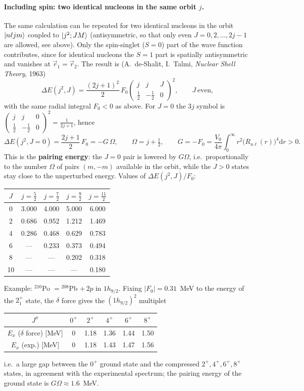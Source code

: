 \documentclass[11pt,a4paper]{article}
\newcommand{\ud}{\mathrm{d}}
\begin{document}
\paragraph{Including spin: two identical nucleons in the same orbit $j$.}
The same calculation can be repeated for two identical nucleons in the orbit $\ket{n\ell jm}$ coupled to $\ket{j^2;JM}$ (antisymmetric, so that only even $J=0,2,\dots,2j-1$ are allowed, see above). Only the spin-singlet ($S=0$) part of the wave function contributes, since for identical nucleons the $S=1$ part is spatially antisymmetric and vanishes at $\vec r_1=\vec r_2$. The result is (A.~de-Shalit, I.~Talmi, \emph{Nuclear Shell Theory}, 1963)
\[
\boxed{\Delta E(j^2,J)=\frac{(2j+1)^2}{2}\,F_0\begin{pmatrix}j&j&J\\\frac12&-\frac12&0\end{pmatrix}^2},\qquad J\ \text{even},
\]
with the same radial integral $F_0<0$ as above. For $J=0$ the 3$j$ symbol is $\begin{pmatrix}j&j&0\\\frac12&-\frac12&0\end{pmatrix}^2=\frac{1}{2j+1}$, hence
\[
\Delta E(j^2,J{=}0)=\frac{2j+1}{2}\,F_0=-G\,\Omega,\qquad \Omega=j+\tfrac12,\qquad G=-F_0=\frac{V_0}{4\pi}\int_0^\infty r^2\big(R_{n\ell}(r)\big)^4\ud r>0 .
\]
This is the \textbf{pairing energy}: the $J=0$ pair is lowered by $G\Omega$, i.e.\ proportionally to the number $\Omega$ of pairs $(m,-m)$ available in the orbit, while the $J>0$ states stay close to the unperturbed energy. Values of $\Delta E(j^2,J)/F_0$:
\begin{center}
\begin{tabular}{c c c c c}
$J$ & $j=\frac52$ & $j=\frac72$ & $j=\frac92$ & $j=\frac{11}{2}$\\ \hline
0 & 3.000 & 4.000 & 5.000 & 6.000\\
2 & 0.686 & 0.952 & 1.212 & 1.469\\
4 & 0.286 & 0.468 & 0.629 & 0.783\\
6 & --- & 0.233 & 0.373 & 0.494\\
8 & --- & --- & 0.202 & 0.318\\
10 & --- & --- & --- & 0.180
\end{tabular}
\end{center}
Example: ${}^{210}$Po $={}^{208}$Pb $+\,2p$ in $1h_{9/2}$. Fixing $|F_0|=0.31$~MeV to the energy of the $2^+_1$ state, the $\delta$ force gives the $(1h_{9/2})^2$ multiplet
\begin{center}
\begin{tabular}{c c c c c c}
$J^\pi$ & $0^+$ & $2^+$ & $4^+$ & $6^+$ & $8^+$\\ \hline
$E_x$ ($\delta$ force) [MeV] & 0 & 1.18 & 1.36 & 1.44 & 1.50\\
$E_x$ (exp.) [MeV] & 0 & 1.18 & 1.43 & 1.47 & 1.56
\end{tabular}
\end{center}
i.e.\ a large gap between the $0^+$ ground state and the compressed $2^+,4^+,6^+,8^+$ states, in agreement with the experimental spectrum; the pairing energy of the ground state is $G\Omega\approx1.6$~MeV.
\end{document}
